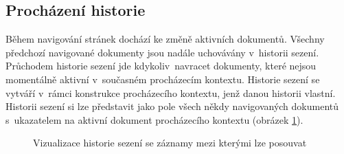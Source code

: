 \subsection{Procházení historie}
\label{Chapter.Implementation.TraversingHistory}

Během navigování stránek dochází ke změně aktivních dokumentů. Všechny předchozí navigované dokumenty jsou nadále uchovávány v~historii sezení. Průchodem historie sezení jde kdykoliv~navracet dokumenty, které nejsou momentálně aktivní v~současném procházecím kontextu. Historie sezení se vytváří v~rámci konstrukce procházecího kontextu, jenž danou historii vlastní. Historii sezení si lze představit jako pole všech někdy navigovaných dokumentů s~ukazatelem na aktivní dokument procházecího kontextu (obrázek \ref{Figure.SessionHistory}).

\begin{figure}[H]
  \begin{center}
    \caption{Vizualizace historie sezení se záznamy mezi kterými lze posouvat}
    \label{Figure.SessionHistory}
  \end{center}
\end{figure}

